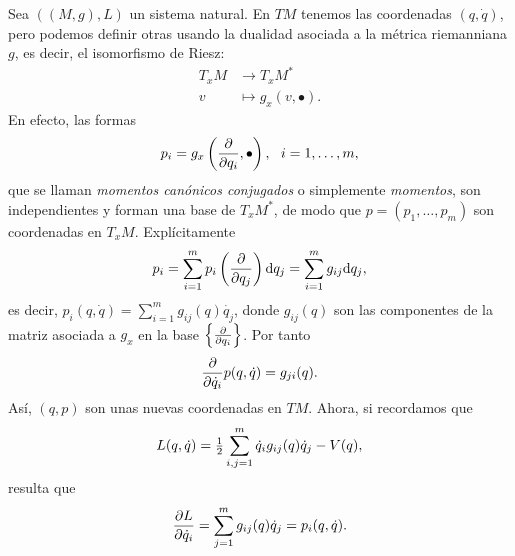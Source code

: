   Sea $\left( (M,g), L \right)$ un sistema natural. En $TM$ tenemos las coordenadas $(q,\dot{q})$, pero podemos definir otras usando la dualidad asociada a la métrica riemanniana $g$, es decir, el isomorfismo de Riesz:
  \begin{align*}
    T_xM & \longrightarrow T_xM^* \\
    v & \longmapsto g_x(v,\bullet).
  \end{align*}
  En efecto, las formas 
  \begin{equation*}
    p_i = g_x\left(\frac{\partial}{\partial q_i},\bullet\right), \ \ i=1,\dots,m,
  \end{equation*}
  que se llaman \emph{momentos canónicos conjugados} o simplemente \emph{momentos}, son independientes y forman una base de $T_xM^*$, de modo que $p=(p_1,\dots,p_m)$ son coordenadas en $T_xM$. Explícitamente
  \begin{equation*}
    p_i= \sum_{i=1}^{m}p_i\left( \frac{\partial}{\partial q_j} \right)\mathrm{d} q_j = \sum_{i=1}^m g_{ij}\mathrm{d} q_j,
  \end{equation*}
  es decir, $p_i(q,\dot{q})=\sum_{i=1}^m g_{ij}(q) \dot{q_j}$, donde $g_{ij}(q)$ son las componentes de la matriz asociada a $g_x$ en la base $\left\lbrace \frac{\partial}{\partial q_i} \right\rbrace$. Por tanto
  \begin{equation*}
    \frac{\partial }{\partial \dot{q}_i}p(q,\dot{q})=g_{ji}(q).
  \end{equation*}
  Así, $(q,p)$ son unas nuevas coordenadas en $TM$. Ahora, si recordamos que 
  \begin{equation*}
    L(q,\dot{q})=\tfrac{1}{2}\sum_{i,j=1}^m \dot{q}_i g_{ij}(q) \dot{q}_j - V(q),
  \end{equation*}
  resulta que
  \begin{equation*}
    \frac{\partial L}{\partial \dot{q}_i}=\sum_{j=1}^m g_{ij}(q)\dot{q}_j=p_i(q,\dot{q}).
  \end{equation*}

